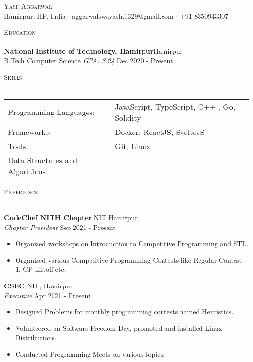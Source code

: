\documentclass[a4paper]{article}
\newcommand{\lineunder} {
    \vspace*{-8pt} \\
    \hspace*{-18pt} \hrulefill \\
}
\newcommand{\header} [1] {
    {\hspace*{-18pt}\vspace*{6pt} \textsc{#1}}
    \vspace*{-6pt} \lineunder
}
\begin{document}
\vspace*{-40pt}



\vspace*{-10pt}
\begin{center}
	{\Huge \scshape {Yash Aggarwal}}\\
	Hamirpur, HP, India $\cdot$ aggarwalswayash.1329@gmail.com $\cdot$ +91 8350943307\\
\end{center}

\header{Education}
\textbf{National Institute of Technology, Hamirpur}\hfill Hamirpur\\
B.Tech Computer Science \textit{GPA: 8.24} \hfill Dec 2020 - Present\\
\vspace{2mm}

\header{Skills}
\begin{tabular}{ l l }
	Programming Languages:          & JavaScript, TypeScript, C++ , Go, Solidity        \\
	Frameworks:                     & Docker, ReactJS, SvelteJS          \\
	Tools:                          & Git, Linux  \\
	Data Structures and Algorithms &                                           \\
\end{tabular}
\vspace{2mm}

\header{Experience}
\vspace{1mm}

\textbf{CodeChef NITH Chapter} \hfill NIT Hamirpur\\
\textit{Chapter President} \hfill Sep 2021 - Present\\
\vspace{-1mm}
\begin{itemize} \itemsep 1pt
	\item Organized workshops on Introduction to Competitive Programming and STL.
	\item Organized various Competitive Programming Contests like Regular Contest 1, CP Liftoff etc.
\end{itemize}
\textbf{CSEC} \hfill NIT, Hamirpur\\
\textit{Executive} \hfill Apr 2021 - Present\\
\vspace{-1mm}
\begin{itemize} \itemsep 1pt
	\item Designed Problems for monthly programming contests named Heuristics.
	\item Volunteered on Software Freedom Day, promoted and installed Linux Distributions.
	\item Conducted Programming Meets on various topics.
\end{itemize}
\end{document}
